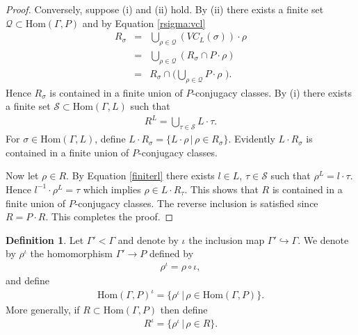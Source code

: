 \documentclass[12pt, a4paper]{amsart}
\numberwithin{equation}{section}
\theoremstyle{definition}
\newtheorem{defn}[equation]{Definition}
\theoremstyle{remark}
\theoremstyle{remark}
\begin{document}
\begin{proof}
Conversely, suppose (i) and (ii) hold. By (ii) there exists a finite set $\mathscr{Q} \subset \mathrm{Hom}(\Gamma, P)$ and by Equation \ref{rsigma:vcl} 
\begin{eqnarray} R_\sigma &=& \bigcup_{\rho \in \mathscr{Q}} (VC_L(\sigma)) \cdot \rho \\
&=& \bigcup_{\rho \in \mathscr{Q}} \left( R_\sigma \cap P \cdot \rho \right) \\
&=& R_\sigma \cap \big( \bigcup_{\rho \in \mathscr{Q}} P \cdot \rho \,\,\big).
\end{eqnarray}
Hence $R_\sigma$ is contained in a finite union of $P$-conjugacy classes. By (i) there exists a finite set $\mathscr{S} \subset \mathrm{Hom}(\Gamma, L)$ such that
\begin{eqnarray} \label{finiterl}
R^L = \bigcup_{\tau \in \mathscr{S}} L \cdot \tau.
\end{eqnarray}
For $\sigma \in \mathrm{Hom}(\Gamma, L)$, define $L \cdot R_\sigma = \{L \cdot \rho \,|\, \rho \in R_\sigma\}$. Evidently $L \cdot R_\sigma$ is contained in a finite union of $P$-conjugacy classes.


Now let $\rho \in R$. By Equation \ref{finiterl} there exists $l \in L$, $\tau \in \mathscr{S}$ such that $\rho^L = l \cdot \tau$. Hence $l^{-1} \cdot \rho^L = \tau$ which implies $\rho \in L \cdot R_\tau$. This shows that $R$ is contained in a finite union of $P$-conjugacy classes. The reverse inclusion is satisfied since $R = P \cdot R$. This completes the proof.
\end{proof}

\begin{defn} Let $\Gamma' < \Gamma$ and denote by $\iota$ the inclusion map $\Gamma' \hookrightarrow \Gamma$. We denote by $\rho^\iota$ the homomorphism $\Gamma' \rightarrow P$ defined by
\begin{eqnarray} \rho^\iota = \rho \circ \iota, \end{eqnarray}
and define
\begin{eqnarray} \mathrm{Hom}(\Gamma, P)^\iota = \{\rho^\iota \,|\, \rho \in \mathrm{Hom}(\Gamma, P) \}. \end{eqnarray}
More generally, if $R \subset \mathrm{Hom}(\Gamma, P)$ then define
\begin{eqnarray} R^\iota = \{\rho^\iota \,|\, \rho \in R\}. \end{eqnarray}
\end{defn}
\end{document}
